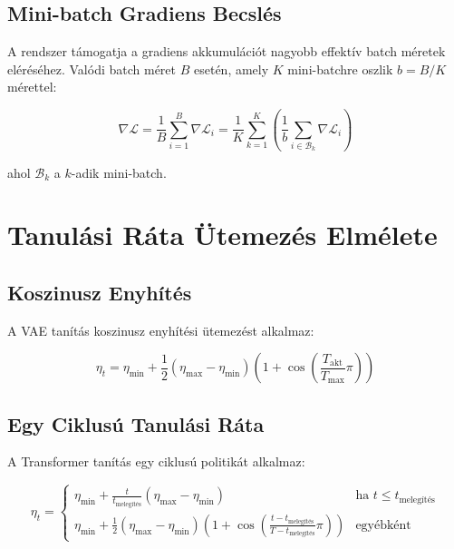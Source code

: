 \subsection{Mini-batch Gradiens Becslés}

A rendszer támogatja a gradiens akkumulációt nagyobb effektív batch méretek eléréséhez. Valódi batch méret $B$ esetén, amely $K$ mini-batchre oszlik $b = B/K$ mérettel:

\begin{equation}
\nabla\mathcal{L} = \frac{1}{B} \sum_{i=1}^B \nabla\mathcal{L}_i = \frac{1}{K} \sum_{k=1}^K \left(\frac{1}{b} \sum_{i \in \mathcal{B}_k} \nabla\mathcal{L}_i\right)
\end{equation}

ahol $\mathcal{B}_k$ a $k$-adik mini-batch.

\section{Tanulási Ráta Ütemezés Elmélete}

\subsection{Koszinusz Enyhítés}

A VAE tanítás koszinusz enyhítési ütemezést alkalmaz:

\begin{equation}
\eta_t = \eta_{\min} + \frac{1}{2}(\eta_{\max} - \eta_{\min})\left(1 + \cos\left(\frac{T_{\text{akt}}}{T_{\max}} \pi\right)\right)
\end{equation}

\subsection{Egy Ciklusú Tanulási Ráta}

A Transformer tanítás egy ciklusú politikát alkalmaz:

\begin{equation}
\eta_t = \begin{cases}
\eta_{\min} + \frac{t}{t_{\text{melegítés}}}(\eta_{\max} - \eta_{\min}) & \text{ha } t \leq t_{\text{melegítés}} \\
\eta_{\min} + \frac{1}{2}(\eta_{\max} - \eta_{\min})\left(1 + \cos\left(\frac{t - t_{\text{melegítés}}}{T - t_{\text{melegítés}}} \pi\right)\right) & \text{egyébként}
\end{cases}
\end{equation}

